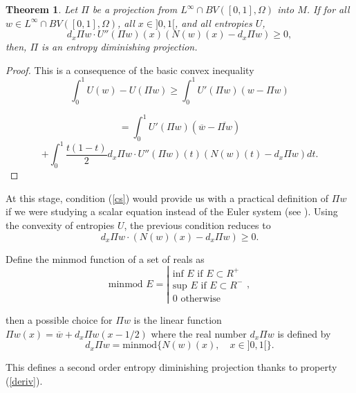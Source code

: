 \documentclass{fldauth}
\theoremstyle{plain}
\newtheorem{thm}{Theorem}
\theoremstyle{plain}
\theoremstyle{plain}
\theoremstyle{plain}
\theoremstyle{plain}
\theoremstyle{plain}
\newtheorem{proof}{Proof}
\begin{document}
\begin{thm}
\label{theorem:perth}Let \( \Pi  \) be a projection from \( L^{\infty }\cap BV([0,1],\Omega ) \)
into \( M \). If for all \( w\in L^{\infty }\cap BV([0,1],\Omega ) \), all
\( x\in ]0,1[ \), and all entropies \( U \),
\begin{equation}
\label{cs}
d_{x}\Pi w\cdot U''(\Pi w)(x)(N(w)(x)-d_{x}\Pi w)\geq 0,
\end{equation}
 then, \( \Pi  \) is an entropy diminishing projection.
\end{thm}
\begin{proof}
This is a consequence of the basic convex inequality
\[
\int _{0}^{1}U(w)-U(\Pi w)\geq \int _{0}^{1}U'(\Pi w)(w-\Pi w)\]

\[
=\int _{0}^{1}U'(\Pi w)(\overline{w}-\overline{\Pi w})\]
\begin{equation}
\label{ineg}
+\int _{0}^{1}\frac{t(1-t)}{2}d_{x}\Pi w\cdot U''(\Pi w)(t)(N(w)(t)-d_{x}\Pi w)dt.
\end{equation}

\end{proof}
At this stage, condition (\ref{cs}) would provide us with a practical definition
of \( \Pi w \) if we were studying a scalar equation instead of the Euler system
(see \cite{bouchut_pertham93}). Using the convexity of entropies \( U \),
the previous condition reduces to
\begin{equation}
\label{minmod:scal} d_{x}\Pi w \cdot (N(w)(x)-d_{x}\Pi w)\geq 0.
\end{equation}


Define the minmod function of a set of reals as
\[
\textrm{minmod }E=\left| \begin{array}{l}
\textrm{inf }E\textrm{ if }E\subset R^{+}\\
\textrm{sup }E\textrm{ if }E\subset R^{-}\\
0\textrm{ otherwise}
\end{array}\right. ,\]


then a possible choice for \( \Pi w \) is the linear function \( \Pi w(x)=\overline{w}+d_{x}\Pi w(x-1/2) \)
where the real number \( d_{x}\Pi w \) is defined by
\begin{equation}
\label{minmodscal}
d_{x}\Pi w=\textrm{minmod}\{N(w)(x),\quad x\in ]0,1[\}.
\end{equation}


This defines a second order entropy diminishing projection thanks to property
(\ref{deriv}).
\end{document}
